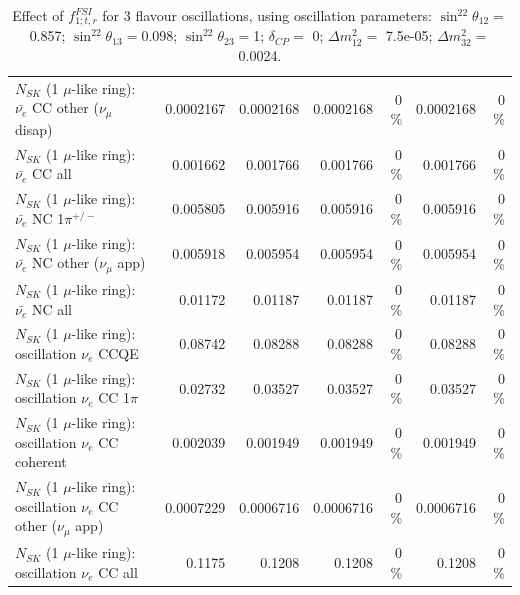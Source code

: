\begin{table}
\begin{tabular}{| l | r | r | r  r | r  r |}
          $N_{SK}$ (1 $\mu$-like ring): $\bar{\nu_e}$ CC other ($\nu_\mu$ disap) &       0.0002167 &       0.0002168 &       0.0002168 &        0 \%  &       0.0002168 &        0 \%  \\ 
                            $N_{SK}$ (1 $\mu$-like ring): $\bar{\nu_{e}}$ CC all &        0.001662 &        0.001766 &        0.001766 &        0 \%  &        0.001766 &        0 \%  \\ 
\hline
                     $N_{SK}$ (1 $\mu$-like ring): $\bar{\nu_e}$ NC 1$\pi^{+/-}$ &        0.005805 &        0.005916 &        0.005916 &        0 \%  &        0.005916 &        0 \%  \\ 
            $N_{SK}$ (1 $\mu$-like ring): $\bar{\nu_e}$ NC other ($\nu_\mu$ app) &        0.005918 &        0.005954 &        0.005954 &        0 \%  &        0.005954 &        0 \%  \\ 
                            $N_{SK}$ (1 $\mu$-like ring): $\bar{\nu_{e}}$ NC all &         0.01172 &         0.01187 &         0.01187 &        0 \%  &         0.01187 &        0 \%  \\ 
\hline
\hline
\hline
                          $N_{SK}$ (1 $\mu$-like ring): oscillation $\nu_e$ CCQE &         0.08742 &         0.08288 &         0.08288 &        0 \%  &         0.08288 &        0 \%  \\ 
                     $N_{SK}$ (1 $\mu$-like ring): oscillation $\nu_e$ CC 1$\pi$ &         0.02732 &         0.03527 &         0.03527 &        0 \%  &         0.03527 &        0 \%  \\ 
                   $N_{SK}$ (1 $\mu$-like ring): oscillation $\nu_e$ CC coherent &        0.002039 &        0.001949 &        0.001949 &        0 \%  &        0.001949 &        0 \%  \\ 
      $N_{SK}$ (1 $\mu$-like ring): oscillation $\nu_e$ CC other ($\nu_\mu$ app) &       0.0007229 &       0.0006716 &       0.0006716 &        0 \%  &       0.0006716 &        0 \%  \\ 
                       $N_{SK}$ (1 $\mu$-like ring): oscillation $\nu_e$  CC all &          0.1175 &          0.1208 &          0.1208 &        0 \%  &          0.1208 &        0 \%  \\ 
\hline
\hline
\end{tabular}
\caption{ Effect of $f_{1; t, r}^{FSI}$ for 3 flavour oscillations, using oscillation parameters:  $\sin^22\theta_{12} = $0.857; $\sin^22\theta_{13} = $0.098; $\sin^22\theta_{23} = $1; $\delta_{CP} = $        0; $\Delta m^2_{12} = $    7.5e-05; $\Delta m^2_{32} = $    0.0024. }
\label{tab:num_fsi_001_1RmuT_3f_osc_t13:0.098_spectralreco_spectraltrue}
\end{table}
